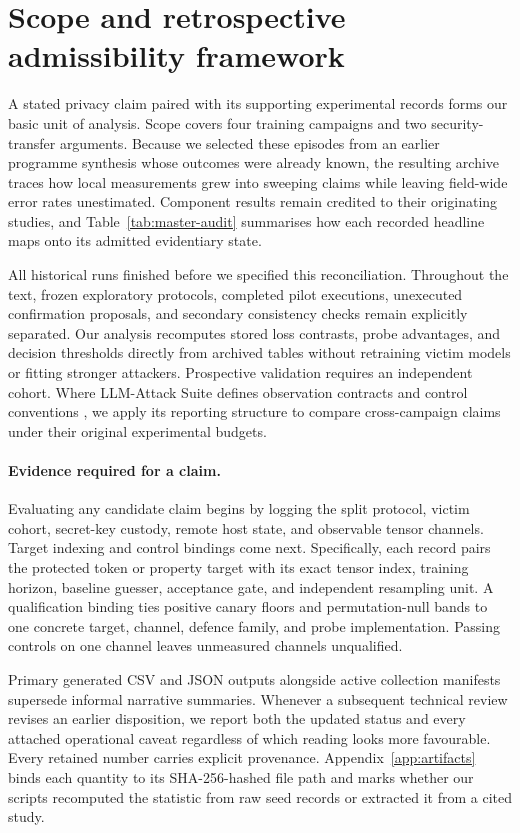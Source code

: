 \section{Scope and retrospective admissibility framework}
\label{sec:design}

A stated privacy claim paired with its supporting experimental records forms
our basic unit of analysis. Scope covers four training campaigns and two
security-transfer arguments. Because we selected these episodes from an
earlier programme synthesis whose outcomes were already known, the resulting
archive traces how local measurements grew into sweeping claims while leaving
field-wide error rates unestimated. Component results remain credited to
their originating studies, and Table~\ref{tab:master-audit} summarises how
each recorded headline maps onto its admitted evidentiary state.

All historical runs finished before we specified this reconciliation.
Throughout the text, frozen exploratory protocols, completed pilot
executions, unexecuted confirmation proposals, and secondary consistency
checks remain explicitly separated. Our analysis recomputes stored loss
contrasts, probe advantages, and decision thresholds directly from archived
tables without retraining victim models or fitting stronger attackers.
Prospective validation requires an independent cohort. Where LLM-Attack
Suite defines observation contracts and control conventions
\cite{suite2026}, we apply its reporting structure to compare cross-campaign
claims under their original experimental budgets.

\paragraph{Evidence required for a claim.}
Evaluating any candidate claim begins by logging the split protocol, victim
cohort, secret-key custody, remote host state, and observable tensor
channels. Target indexing and control bindings come next. Specifically, each
record pairs the protected token or property target with its exact tensor
index, training horizon, baseline guesser, acceptance gate, and independent
resampling unit. A qualification binding ties positive canary floors and
permutation-null bands to one concrete target, channel, defence family, and
probe implementation. Passing controls on one channel leaves unmeasured
channels unqualified.

Primary generated CSV and JSON outputs alongside active collection manifests
supersede informal narrative summaries. Whenever a subsequent technical
review revises an earlier disposition, we report both the updated status and
every attached operational caveat regardless of which reading looks more
favourable. Every retained number carries explicit provenance.
Appendix~\ref{app:artifacts} binds each quantity to its SHA-256-hashed file
path and marks whether our scripts recomputed the statistic from raw seed
records or extracted it from a cited study.

